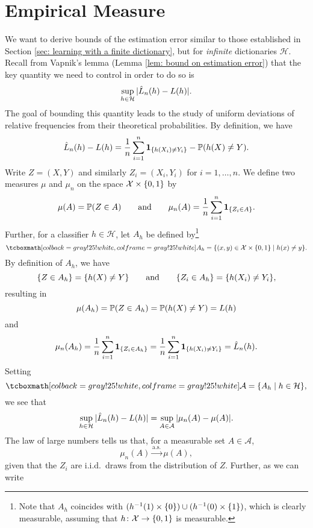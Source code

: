 \section{Empirical Measure}

We want to derive bounds of the estimation error similar to those established in Section \ref{sec: learning with a finite dictionary}, but for \emph{infinite} dictionaries $\mathcal{H}$. Recall from Vapnik's lemma (Lemma \ref{lem: bound on estimation error}) that the key quantity we need to control in order to do so is
\[
    \sup_{h \in \mathcal{H}} \abs*{\hat{L}_n(h) - L(h)}.
\]
The goal of bounding this quantity leads to the study of uniform deviations of relative frequencies from their theoretical probabilities. By definition, we have
\[
    \hat{L}_n(h) - L(h) = \frac{1}{n} \sum_{i=1}^n \indSet{h(X_i) \neq Y_i} - \Prob(h(X) \neq Y).
\]
Write $Z = (X, Y)$ and similarly $Z_i = (X_i, Y_i)$ for $i = 1, \dots, n$. We define two measures $\mu$ and $\mu_n$ on the space $\mathcal{X} \times \set{0, 1}$ by
\[
    \mu(A) = \Prob(Z \in A) \qquad \text{and} \qquad \mu_n(A) = \frac{1}{n} \sum_{i=1}^n \indSet{Z_i \in A}.
\]
Further, for a classifier $h \in \mathcal{H}$, let $A_h$ be defined by\footnote{Note that $A_h$ coincides with $(h^{-1}(1) \times \set{0}) \cup (h^{-1}(0) \times \set{1})$, which is clearly measurable, assuming that $h \colon \mathcal{X} \to \set{0, 1}$ is measurable.}
\begin{equation}
\label{eq: sets A_h}
    \highlightMath{
        A_h = \{(x, y) \in \mathcal{X} \times \set{0, 1} \with h(x) \neq y\}.
    }
\end{equation}
By definition of $A_h$, we have
\[
    \set{Z \in A_h} = \set{h(X) \neq Y} \qquad \text{and} \qquad \set{Z_i \in A_h} = \set{h(X_i) \neq Y_i},
\]
resulting in
\[
    \mu(A_h) = \operatorname{\mathbb{P}}(Z \in A_h) = \operatorname{\mathbb{P}}(h(X) \neq Y) = L(h)
\]
and
\[
    \mu_n(A_h) = \frac{1}{n} \sum_{i=1}^n \indSet{Z_i \in A_h} = \frac{1}{n} \sum_{i=1}^n \indSet{h(X_i) \neq Y_i} = \hat{L}_n(h).
\]
Setting
\begin{equation}
\label{eq: collection of sets A_h}
    \highlightMath{
        \mathcal{A} = \set{A_h \with h \in \mathcal{H}},
    }
\end{equation}
we see that
\[
    \sup_{h \in \mathcal{H}} \abs*{\hat{L}_n(h) - L(h)} = \sup_{A \in \mathcal{A}} \abs{\mu_n(A) - \mu(A)}.
\]
The law of large numbers tells us that, for a measurable set $A \in \mathcal{A}$,
\[
    \mu_n(A) \xrightarrow{\mathrm{a.s.}} \mu(A),
\]
given that the $Z_i$ are i.i.d.\ draws from the distribution of $Z$. Further, as we can write
